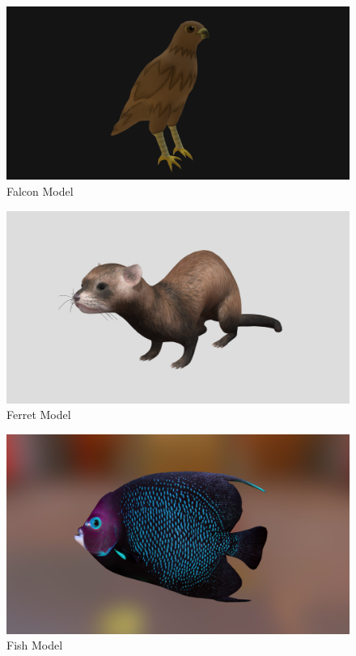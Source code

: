 \documentclass{article}
\begin{document}
    \begin{figure}
        \centering
        \includegraphics[width=\textwidth]{images/models/falcon.png}
        \caption{Falcon Model \cite{model-falcon}} \label{fig:falcon-model}
    \end{figure}
    \begin{figure}
        \centering
        \includegraphics[width=\textwidth]{images/models/ferret.png}
        \caption{Ferret Model \cite{model-ferret}} \label{fig:ferret-model}
    \end{figure}
    \begin{figure}
        \centering
        \includegraphics[width=\textwidth]{images/models/fish.png}
        \caption{Fish Model \cite{model-fish}} \label{fig:fish-model}
    \end{figure}
\end{document}
